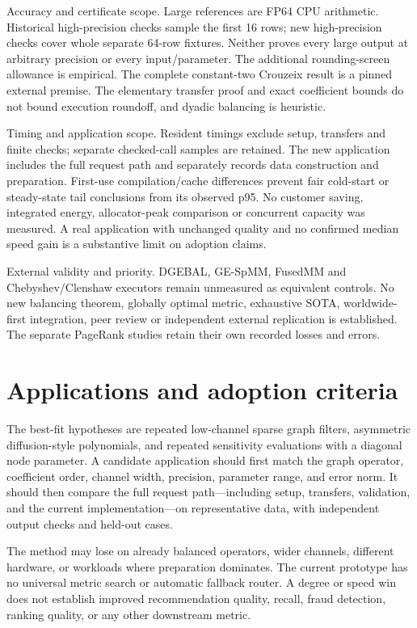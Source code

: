 \documentclass[10pt]{article}
\begin{document}
Accuracy and certificate scope. Large references are FP64 CPU arithmetic. Historical high-precision checks sample the first 16 rows; new high-precision checks cover whole separate 64-row fixtures. Neither proves every large output at arbitrary precision or every input/parameter. The additional rounding-screen allowance is empirical. The complete constant-two Crouzeix result is a pinned external premise. The elementary transfer proof and exact coefficient bounds do not bound execution roundoff, and dyadic balancing is heuristic.

Timing and application scope. Resident timings exclude setup, transfers and finite checks; separate checked-call samples are retained. The new application includes the full request path and separately records data construction and preparation. First-use compilation/cache differences prevent fair cold-start or steady-state tail conclusions from its observed p95. No customer saving, integrated energy, allocator-peak comparison or concurrent capacity was measured. A real application with unchanged quality and no confirmed median speed gain is a substantive limit on adoption claims.

External validity and priority. DGEBAL, GE-SpMM, FusedMM and Chebyshev/Clenshaw executors remain unmeasured as equivalent controls. No new balancing theorem, globally optimal metric, exhaustive SOTA, worldwide-first integration, peer review or independent external replication is established. The separate PageRank studies retain their own recorded losses and errors.


\section{Applications and adoption criteria}

The best-fit hypotheses are repeated low-channel sparse graph filters, asymmetric diffusion-style polynomials, and repeated sensitivity evaluations with a diagonal node parameter. A candidate application should first match the graph operator, coefficient order, channel width, precision, parameter range, and error norm. It should then compare the full request path---including setup, transfers, validation, and the current implementation---on representative data, with independent output checks and held-out cases.

The method may lose on already balanced operators, wider channels, different hardware, or workloads where preparation dominates. The current prototype has no universal metric search or automatic fallback router. A degree or speed win does not establish improved recommendation quality, recall, fraud detection, ranking quality, or any other downstream metric.
\end{document}

